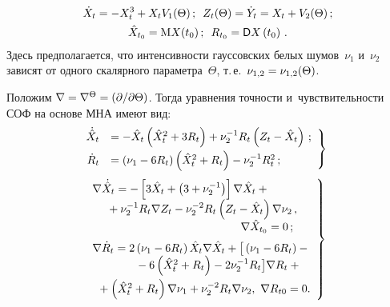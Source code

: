 \begin{multicols}{2}
\noindent
\begin{gather*}
\dot X_t =- X_t^3 + X_t V_1(\Theta)\,;\enskip Z_t (\Theta) = 
\dot Y_t= X_t + V_2(\Theta)\,; %
\\
\hat X_{t_0} = \mm X(t_0)\,;\enskip R_{t_0} = {\sf D}X\left(t_0\right)\,.
\end{gather*}
Здесь предполагается, что  интенсивности гауссовских белых шумов~$\nu_1$ и~$\nu_2$ 
зависят от одного скалярного параметра~$\Theta$, т.\,е.\ $\nu_{1,2} \hm= 
\nu_{1,2} (\Theta)$.

Положим $\nabla =\nabla^\Theta\hm= (\prt / \prt \Theta)$. Тогда уравнения точности 
и~чувствительности СОФ на основе МНА имеют вид:
  \begin{equation}
  \left.
  \hspace*{-3mm}\begin{array}{rl}
  \dot{\hat X}_t &= - \hat X_t \left( \hat X_t^2 + 3 R_t\right) + 
  \nu_2^{-1} R_t \left(Z_t - \hat X_t\right)\,; %
  \\[6pt]
  \dot R_t &= \left(\nu_1 - 6 R_t\right) \left( \hat X_t^2 + R_t\right) - 
  \nu_2^{-1} R_t^2\,;
  \end{array}
  \right\}
  \label{e5.4-s1}
  \end{equation}
    \begin{equation}
    \left.
    \begin{array}{l}
\hspace*{-1.5mm}\nabla \dot{\hat X}_t = - \lk 3\hat X_t +\left(3 + \nu_2^{-1} \right)\rk 
\nabla\hat X_t+ {}\\
\hspace*{3mm}{}+\nu_2^{-1} R_t \nabla Z_t - \nu_2^{-2} R_t \left(Z_t -\hat X_t\right)
    \nabla \nu_2\,,\\    
    \hspace*{45mm} \nabla \hat X_{t_0}=0\,;
    \\[6pt]
\hspace*{-1.5mm}\nabla \dot R_t = 2\left(\nu_1 - 6 R_t\right) \hat X_t \nabla \hat X_t + \big[ 
\left(\nu_1 - 6 R_t\right) - {}\\
\hspace*{12mm}{}-6 \left(\hat X_t^2 + R_t\right) - 
2 \nu_2^{-1} R_t\big] \nabla R_t +{}\\[6pt]
{}+ \left(\hat X_t^2 + R_t\right) \nabla \nu_1 + \nu_2^{-2}R_t \nabla \nu_2,\ 
\nabla R_{t0}=0.
\end{array}
\right\}
\label{e5.6-s1}
\end{equation}


\end{multicols}
